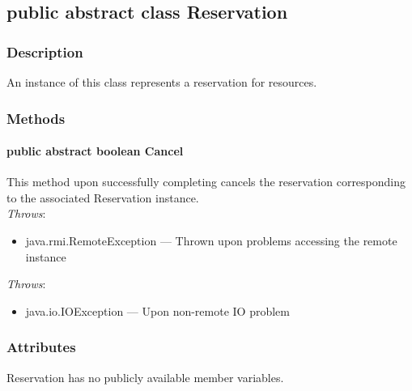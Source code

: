 \documentclass[$Date: 2003/06/26 19:29:31 $]{glabarticle}
\begin{document}
\newpage

\subsection{public abstract class Reservation}


\subsubsection{Description} 

An instance of this class represents a reservation for resources. \\


\subsubsection{Methods}

\paragraph{public abstract boolean Cancel}

This method upon successfully completing cancels the reservation corresponding to the associated 
Reservation instance. \\

 \textit{Throws}:
 \begin{itemize}
 \item[] java.rmi.RemoteException --- Thrown upon problems accessing the remote instance 
 \end{itemize}
 
 \textit{Throws}:
\begin{itemize}
\item[] java.io.IOException --- Upon non-remote IO problem 
\end{itemize}    


\subsubsection{Attributes}

Reservation has no publicly available member variables.
\end{document}
